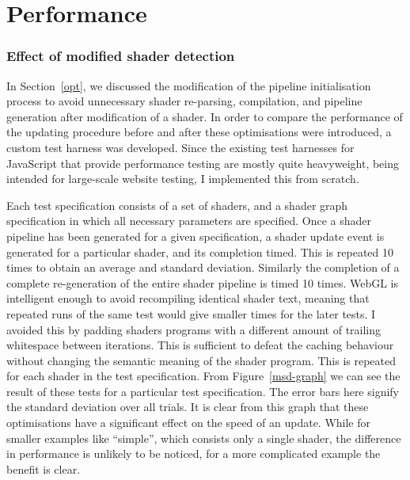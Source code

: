 \documentclass[12pt,twoside,notitlepage]{report}
\begin{document}
\section{Performance}
\subsubsection{Effect of modified shader detection}
In Section~\ref{opt}, we discussed the modification of the pipeline initialisation process to avoid unnecessary shader re-parsing, compilation, and pipeline generation after modification of a shader. In order to compare the performance of the updating procedure before and after these optimisations were introduced, a custom test harness was developed. Since the existing test harnesses for JavaScript that provide performance testing are mostly quite heavyweight, being intended for large-scale website testing, I implemented this from scratch.

Each test specification consists of a set of shaders, and a shader graph specification in which all necessary parameters are specified. Once a shader pipeline has been generated for a given specification, a shader update event is generated for a particular shader, and its completion timed. This is repeated 10 times to obtain an average and standard deviation. Similarly the completion of a complete re-generation of the entire shader pipeline is timed 10 times. WebGL is intelligent enough to avoid recompiling identical shader text, meaning that repeated runs of the same test would give smaller times for the later tests. I avoided this by padding shaders programs with a different amount of trailing whitespace between iterations. This is sufficient to defeat the caching behaviour without changing the semantic meaning of the shader program. This is repeated for each shader in the test specification. From Figure~\ref{msd-graph} we can see the result of these tests for a particular test specification. The error bars here signify the standard deviation over all trials. It is clear from this graph that these optimisations have a significant effect on the speed of an update. While for smaller examples like ``simple'', which consists only a single shader, the difference in performance is unlikely to be noticed, for a more complicated example the benefit is clear.
\end{document}
